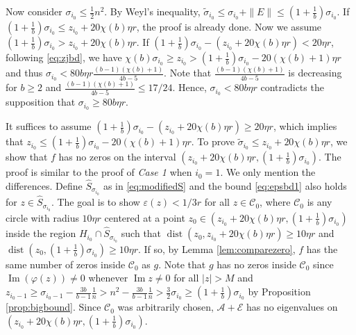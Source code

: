 \documentclass[reqno]{amsart}
\DeclareMathOperator{\dist}{dist}
\renewcommand\Im{\operatorname{Im}}
\theoremstyle{plain}
\theoremstyle{definition}
\begin{document}
Now consider $\sigma_{i_0} \le \frac{1}{2}n^2$. By Weyl's inequality, $\widetilde \sigma_{i_0} \le \sigma_{i_0} + \|E\| \le (1+\frac{1}{b})\sigma_{i_0}$. If $(1+\frac{1}{b})\sigma_{i_0} \le z_{i_0} + 20\chi(b)\eta r$,   the proof is already done. Now we assume $(1+\frac{1}{b})\sigma_{i_0} > z_{i_0} + 20\chi(b)\eta r$. If $(1+\frac{1}{b})\sigma_{i_0} - (z_{i_0} + 20\chi(b)\eta r)< 20\eta r$, following \eqref{eq:zjbd},  we have $\chi(b)\sigma_{i_0} \ge z_{i_0} > (1+\frac{1}{b})\sigma_{i_0} - 20(\chi(b)+1)\eta r$ and thus $\sigma_{i_0} < 80b\eta r\frac{(b-1)(\chi(b)+1)}{4b-5} $. Note that $\frac{(b-1)(\chi(b)+1)}{4b-5}$ is decreasing for $b\ge 2$ and $\frac{(b-1)(\chi(b)+1)}{4b-5} \le 17/24$.  Hence,  $\sigma_{i_0} < 80b\eta r$ contradicts the supposition that $\sigma_{i_0} \ge 80b\eta r$. %

It suffices to assume $(1+\frac{1}{b})\sigma_{i_0} - (z_{i_0} + 20\chi(b)\eta r)\ge 20\eta r$, which implies that $z_{i_0} \le (1+\frac{1}{b})\sigma_{i_0} - 20(\chi(b)+1)\eta r$. To prove $\widetilde \sigma_{i_0} \le z_{i_0} + 20\chi(b)\eta r$, we show that $f$ has no zeros on the interval $(z_{i_0}+20\chi(b)\eta r, (1+\frac{1}{b})\sigma_{i_0})$. The proof is similar to the proof of \emph{Case 1} when $i_0=1$. We only mention the differences. Define $\hat{S}_{\sigma_{i_0}}$ as in \eqref{eq:modifiedS} and the bound \eqref{eq:epsbd1} also holds for $z\in \hat{S}_{\sigma_{i_0}}$. The goal is to show $\varepsilon(z)<1/3r$ for all $z\in\mathcal C_0$, where $\mathcal C_0$ is any circle with radius $10  \eta r$ centered at a point $z_0 \in (z_{i_0}+20\chi(b) \eta r, (1+\frac{1}{b})\sigma_{i_0})$  inside the region $H_{i_0} \cap \hat{S}_{\sigma_{i_0}}$ such that $\dist(z_{0},z_{i_0}+20\chi(b) \eta r) \geq 10  \eta r$ and $\dist(z_{0},(1+\frac{1}{b})\sigma_{i_0}) \geq 10  \eta r$. If so, by Lemma \ref{lem:comparezero}, $f$ has the same number of zeros inside $\mathcal C_0$ as $g$.  Note that $g$ has no zeros inside $\mathcal C_0$ since $\Im(\varphi(z)) \neq 0$ whenever $\Im z \neq 0$ for all $|z| > M$ and $z_{i_0-1} \ge \sigma_{i_0-1} - \frac{3b}{b-1}\frac{1}{n} > n^2 - \frac{3b}{b-1}\frac{1}{n} > \frac{3}{2}\sigma_{i_0}\ge(1+\frac{1}{b})\sigma_{i_0}$ by Proposition \ref{prop:bigbound}. Since $\mathcal{C}_0$ was arbitrarily chosen, $\mathcal A + \mathcal E$ has no eigenvalues on $(z_{i_0}+20\chi(b)\eta r, (1+\frac{1}{b})\sigma_{i_0})$. 
\end{document}
